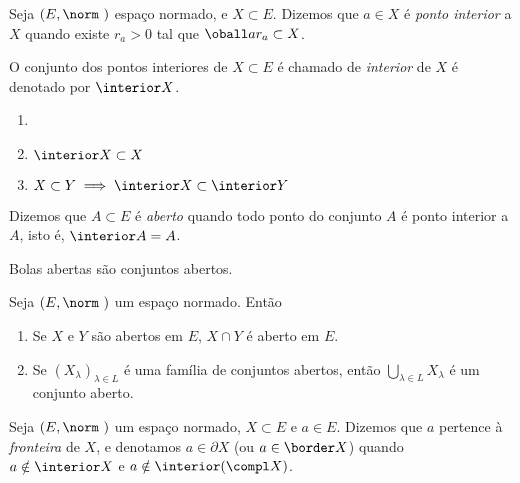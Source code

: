 \begin{definition}
	Seja $(E,\norm\ )$ espaço normado, e $X \subset E$. Dizemos que $a \in X$ é \emph{ponto interior}
	a $X$ quando existe $r_a > 0$ tal que $\oball a{r_a} \subset X$. 
\end{definition}

\begin{definition}
	O conjunto dos pontos interiores de $X \subset E$ é chamado de \emph{interior} de $X$
	é denotado por $\interior X$.
\end{definition}

\begin{fact}
	\begin{enumerate}
		\item[]
		\item $\interior X \subset X$
		\item $X \subset Y \implies \interior X \subset \interior Y$
	\end{enumerate}
\end{fact}

\begin{definition}
	Dizemos que $A \subset E$ é \emph{aberto} quando todo ponto do conjunto $A$
	é ponto interior a $A$, isto é, $\interior A = A$.
\end{definition}

\begin{fact}
	Bolas abertas são conjuntos abertos.
\end{fact}

\begin{fact}
	Seja $(E, \norm \ )$ um espaço normado. Então 
	\begin{enumerate}
		\item Se $X$ e $Y$ são abertos em $E$, $X\cap Y$ é aberto em $E$.
		\item Se $(X_\lambda)_{\lambda \in L}$ é uma família de conjuntos abertos, então
		$\bigcup\limits_{\lambda \in L}X_\lambda$ é um conjunto aberto.
	\end{enumerate}
\end{fact}

\begin{definition}
	Seja $(E,\norm\ )$ um espaço normado, $X \subset E$ e $a \in E$. Dizemos que $a$
	pertence à \emph{fronteira} de $X$, e denotamos $a \in \partial X$ (ou $a \in \border X$) quando 
	$a \notin \interior X$ e $a \notin \interior(\compl X)$.
\end{definition}

